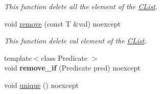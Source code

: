 \begin{DoxyCompactItemize}
\begin{DoxyCompactList}\small\item\em This function delete all the element of the \hyperlink{classnsSdD_1_1CList}{C\+List}. \end{DoxyCompactList}\item 
void \hyperlink{classnsSdD_1_1CList_a55651384c55447be5c4d9edd1565ad1f}{remove} (const T \&val) noexcept
\begin{DoxyCompactList}\small\item\em This function delete {\ttfamily val} element of the \hyperlink{classnsSdD_1_1CList}{C\+List}. \end{DoxyCompactList}\item 
\hypertarget{classnsSdD_1_1CList_a0ad14711538606425a28a357bd1c74bf}{{\footnotesize template$<$class Predicate $>$ }\\void {\bfseries remove\+\_\+if} (Predicate pred) noexcept}\label{classnsSdD_1_1CList_a0ad14711538606425a28a357bd1c74bf}

\item 
\hypertarget{classnsSdD_1_1CList_abc7b9f069918d17942e8baabccb97a5d}{void \hyperlink{classnsSdD_1_1CList_abc7b9f069918d17942e8baabccb97a5d}{unique} () noexcept}\label{classnsSdD_1_1CList_abc7b9f069918d17942e8baabccb97a5d}


\end{DoxyCompactItemize}
